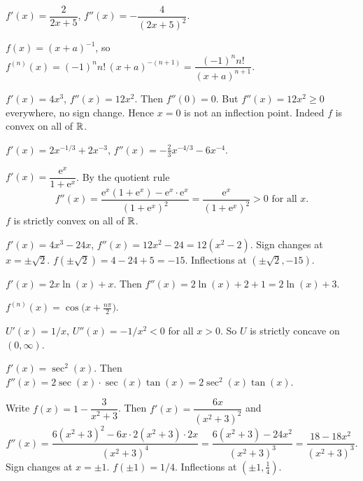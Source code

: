 \begin{solutions}
  \item $f'(x)=\dfrac{2}{2x+5}$, $f''(x)=-\dfrac{4}{(2x+5)^{2}}$.

  \item $f(x)=(x+a)^{-1}$, so
        $f^{(n)}(x)=(-1)^{n}n!\,(x+a)^{-(n+1)}=\dfrac{(-1)^{n}n!}{(x+a)^{n+1}}$.

  \item $f'(x)=4x^{3}$, $f''(x)=12x^{2}$. Then $f''(0)=0$. But
        $f''(x)=12x^{2}\geq 0$ everywhere, no sign change. Hence $x=0$
        is not an inflection point. Indeed $f$ is convex on all of $\mathbb{R}$.

  \item $f'(x)=2x^{-1/3}+2x^{-3}$,
        $f''(x)=-\tfrac{2}{3}x^{-4/3}-6x^{-4}$.

  \item $f'(x)=\dfrac{\mathrm{e}^{x}}{1+\mathrm{e}^{x}}$. By the quotient
        rule
        \[
          f''(x)=\frac{\mathrm{e}^{x}(1+\mathrm{e}^{x})-\mathrm{e}^{x}\cdot\mathrm{e}^{x}}
                       {(1+\mathrm{e}^{x})^{2}}
                =\frac{\mathrm{e}^{x}}{(1+\mathrm{e}^{x})^{2}}>0
          \text{ for all } x .
        \]
        $f$ is strictly convex on all of $\mathbb{R}$.

  \item $f'(x)=4x^{3}-24x$, $f''(x)=12x^{2}-24=12(x^{2}-2)$. Sign changes
        at $x=\pm\sqrt{2}$. $f(\pm\sqrt{2})=4-24+5=-15$. Inflections at
        $(\pm\sqrt{2},-15)$.

  \item $f'(x)=2x\ln(x)+x$. Then $f''(x)=2\ln(x)+2+1=2\ln(x)+3$.

  \item $f^{(n)}(x)=\cos\bigl(x+\tfrac{n\pi}{2}\bigr)$.

  \item $U'(x)=1/x$, $U''(x)=-1/x^{2}<0$ for all $x>0$. So $U$ is strictly
        concave on $(0,\infty)$.

  \item $f'(x)=\sec^{2}(x)$. Then
        $f''(x)=2\sec(x)\cdot\sec(x)\tan(x)=2\sec^{2}(x)\tan(x)$.

  \item Write $f(x)=1-\dfrac{3}{x^{2}+3}$. Then
        $f'(x)=\dfrac{6x}{(x^{2}+3)^{2}}$ and
        \[
          f''(x)=\frac{6(x^{2}+3)^{2}-6x\cdot 2(x^{2}+3)\cdot 2x}
                       {(x^{2}+3)^{4}}
                =\frac{6(x^{2}+3)-24x^{2}}{(x^{2}+3)^{3}}
                =\frac{18-18x^{2}}{(x^{2}+3)^{3}} .
        \]
        Sign changes at $x=\pm 1$. $f(\pm 1)=1/4$. Inflections at
        $(\pm 1,\tfrac14)$.


\end{solutions}
